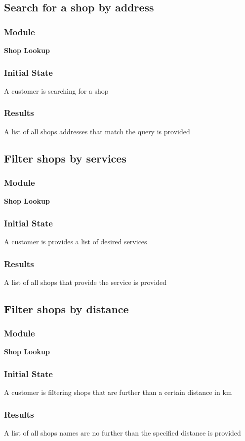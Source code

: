 \documentclass[12pt, titlepage]{article}
\begin{document}
\subsection{Search for a shop by address}
    \subsubsection{Module}
    \textbf{Shop Lookup}
    \subsubsection{Initial State}
    A customer is searching for a shop 
    \subsubsection{Results}
    A list of all shops addresses that match the query is provided

\subsection{Filter shops by services}
    \subsubsection{Module}
    \textbf{Shop Lookup}
    \subsubsection{Initial State}
    A customer is provides a list of desired services
    \subsubsection{Results}
    A list of all shops that provide the service is provided

\subsection{Filter shops by distance}
    \subsubsection{Module}
    \textbf{Shop Lookup}
    \subsubsection{Initial State}
    A customer is filtering shops that are further than a certain distance in km
    \subsubsection{Results}
    A list of all shops names are no further than the specified distance is provided
\end{document}
